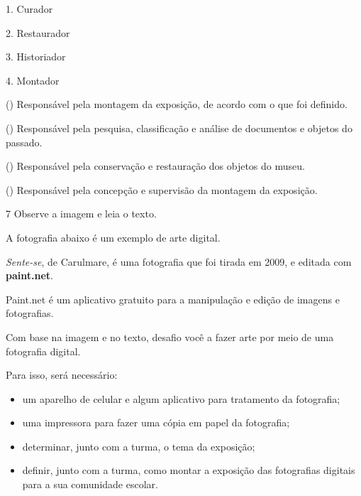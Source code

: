 \begin{multicols}{2}

1. Curador

2. Restaurador

3. Historiador

4. Montador

\columnbreak

() Responsável pela montagem da exposição, de acordo com o que foi definido.

() Responsável pela pesquisa, classificação e análise de documentos e objetos do passado.

() Responsável pela conservação e restauração dos objetos do museu.

() Responsável pela concepção e supervisão da montagem da exposição.
\end{multicols}



\num{7}  Observe a imagem e leia o texto.

A fotografia abaixo é um exemplo de arte digital.


\emph{Sente-se}, de Carulmare, é uma fotografia que foi tirada em 2009,
e editada com \textbf{paint.net}.

Paint.net é um aplicativo gratuito para a manipulação e edição de
imagens e fotografias.

Com base na imagem e no texto, desafio você a fazer arte por meio de uma
fotografia digital.

Para isso, será necessário:

\begin{itemize}
\item
  um aparelho de celular e algum aplicativo para tratamento da
  fotografia;
\item
  uma impressora para fazer uma cópia em papel da fotografia;
\item
  determinar, junto com a turma, o tema da exposição;
\item
  definir, junto com a turma, como montar a exposição das fotografias
  digitais para a sua comunidade escolar.
\end{itemize}

